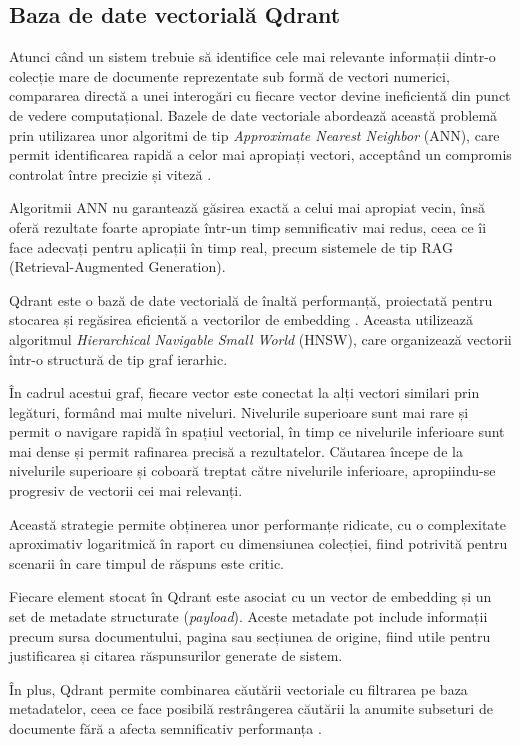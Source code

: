\documentclass[12pt, a4paper, oneside, romanian]{teza-upb}
\begin{document}
\subsection{Baza de date vectorială Qdrant}

Atunci când un sistem trebuie să identifice cele mai relevante informații 
dintr-o colecție mare de documente reprezentate sub formă de vectori numerici, 
compararea directă a unei interogări cu fiecare vector devine ineficientă din punct de vedere computațional. 
Bazele de date vectoriale abordează această problemă prin utilizarea unor algoritmi de tip 
\textit{Approximate Nearest Neighbor} (ANN), care permit identificarea rapidă a celor mai apropiați vectori, 
acceptând un compromis controlat între precizie și viteză \cite{malkov2018hnsw}.

Algoritmii ANN nu garantează găsirea exactă a celui mai apropiat vecin, însă oferă rezultate foarte apropiate 
într-un timp semnificativ mai redus, ceea ce îi face adecvați pentru aplicații în timp real, precum sistemele 
de tip RAG (Retrieval-Augmented Generation).

Qdrant este o bază de date vectorială de înaltă performanță, proiectată pentru stocarea și regăsirea eficientă 
a vectorilor de embedding \cite{qdrant_doc}. Aceasta utilizează algoritmul 
\textit{Hierarchical Navigable Small World} (HNSW), care organizează vectorii într-o structură de tip graf ierarhic.

În cadrul acestui graf, fiecare vector este conectat la alți vectori similari prin legături, formând mai multe niveluri. 
Nivelurile superioare sunt mai rare și permit o navigare rapidă în spațiul vectorial, în timp ce nivelurile inferioare 
sunt mai dense și permit rafinarea precisă a rezultatelor. Căutarea începe de la nivelurile superioare și coboară treptat 
către nivelurile inferioare, apropiindu-se progresiv de vectorii cei mai relevanți.

Această strategie permite obținerea unor performanțe ridicate, cu o complexitate aproximativ logaritmică 
în raport cu dimensiunea colecției, fiind potrivită pentru scenarii în care timpul de răspuns este critic.

Fiecare element stocat în Qdrant este asociat cu un vector de embedding și un set de metadate structurate 
(\textit{payload}). Aceste metadate pot include informații precum sursa documentului, pagina sau secțiunea de origine, 
fiind utile pentru justificarea și citarea răspunsurilor generate de sistem.

În plus, Qdrant permite combinarea căutării vectoriale cu filtrarea pe baza metadatelor, ceea ce face posibilă 
restrângerea căutării la anumite subseturi de documente fără a afecta semnificativ performanța \cite{qdrant_doc}.
\end{document}

